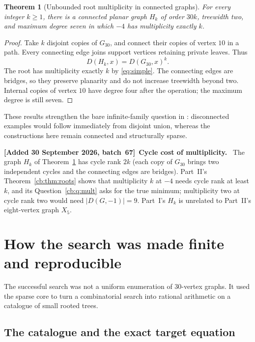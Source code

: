\documentclass[11pt]{article}
\numberwithin{equation}{section}
\newtheorem{theorem}{Theorem}[section]
\theoremstyle{definition}
\newenvironment{writenote}[1][]{\par\smallskip\begingroup\small\sloppy
 \noindent\textbf{[Added 30 September 2026, batch~67]}\if\relax\detokenize{#1}\relax\else~\textbf{#1.}\fi\ }%
 {\par\endgroup\smallskip}
\newcommand{\D}{D}
\newcommand{\Gthirty}{G_{30}}
\begin{document}
\begin{theorem}[Unbounded root multiplicity in connected graphs]\label{thm:mult}
For every integer \(k\ge1\), there is a connected planar graph \(H_k\)
of order \(30k\), treewidth two, and maximum degree seven in which
\(-4\) has multiplicity exactly \(k\).
\end{theorem}
\begin{proof}
Take \(k\) disjoint copies of \(\Gthirty\), and connect their copies
of vertex \(10\) in a path. Every connecting edge joins support
vertices retaining private leaves. Thus
\[
 \D(H_k,x)=\D(\Gthirty,x)^k.
\]
The root has multiplicity exactly \(k\) by \eqref{eq:simple}. The
connecting edges are bridges, so they preserve planarity and do not
increase treewidth beyond two. Internal copies of vertex \(10\) have
degree four after the operation; the maximum degree is still seven.
\end{proof}

These results strengthen the bare infinite-family question in
\cite[Section~4, question~3]{AG}: disconnected examples would follow
immediately from disjoint union, whereas the constructions here remain
connected and structurally sparse.

\begin{writenote}[Cycle cost of multiplicity]
The graph \(H_k\) of Theorem~\ref{thm:mult} has cycle rank \(2k\) (each
copy of \(\Gthirty\) brings two independent cycles and the connecting
edges are bridges). Part~II's Theorem~\ref{cb:thm:roots} shows that
multiplicity \(k\) at \(-4\) needs cycle rank at least \(k\), and its
Question~\ref{cb:q:mult} asks for the true minimum; multiplicity two at
cycle rank two would need \(|\D(G,-1)|=9\). Part~I's \(H_k\) is unrelated
to Part~II's eight-vertex graph \(X_5\).
\end{writenote}

\section{How the search was made finite and reproducible}\label{sec:search}

The successful search was not a uniform enumeration of 30-vertex
graphs. It used the sparse core to turn a combinatorial search into
rational arithmetic on a catalogue of small rooted trees.

\subsection{The catalogue and the exact target equation}
\end{document}
